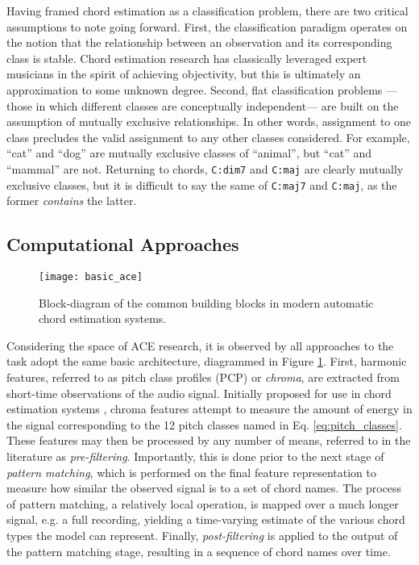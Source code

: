 Having framed chord estimation as a classification problem, there are two critical assumptions to note going forward.
First, the classification paradigm operates on the notion that the relationship between an observation and its corresponding class is stable.
Chord estimation research has classically leveraged expert musicians in the spirit of achieving objectivity, but this is ultimately an approximation to some unknown degree.
Second, flat classification problems ---those in which different classes are conceptually independent--- are built on the assumption of mutually exclusive relationships.
In other words, assignment to one class precludes the valid assignment to any other classes considered.
For example, ``cat'' and ``dog'' are mutually exclusive classes of ``animal'', but ``cat'' and ``mammal'' are not.
Returning to chords, \texttt{C:dim7} and \texttt{C:maj} are clearly mutually exclusive classes, but it is difficult to say the same of \texttt{C:maj7} and \texttt{C:maj}, as the former \emph{contains} the latter.


\subsection{Computational Approaches}
\label{subsec:computational_approaches}

\begin{figure}[t]
\centering
\texttt{[image: basic\_ace]}
\caption{Block-diagram of the common building blocks in modern automatic chord estimation systems.}
\label{fig:basic_ace}
\end{figure}

Considering the space of ACE research, it is observed by \cite{Cho2014Improved} all approaches to the task adopt the same basic architecture, diagrammed in Figure \ref{fig:basic_ace}.
First, harmonic features, referred to as pitch class profiles (PCP) or \emph{chroma}, are extracted from short-time observations of the audio signal.
Initially proposed for use in chord estimation systems \cite{Fujishima1999Realtime}, chroma features attempt to measure the amount of energy in the signal corresponding to the 12 pitch classes named in Eq. \ref{eq:pitch_classes}.
These features may then be processed by any number of means, referred to in the literature as \emph{pre-filtering}.
Importantly, this is done prior to the next stage of \emph{pattern matching}, which is performed on the final feature representation to measure how similar the observed signal is to a set of chord names.
The process of pattern matching, a relatively local operation, is mapped over a much longer signal, e.g. a full recording, yielding a time-varying estimate of the various chord types the model can represent.
Finally, \emph{post-filtering} is applied to the output of the pattern matching stage, resulting in a sequence of chord names over time.

